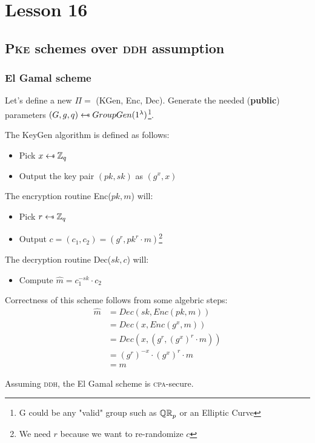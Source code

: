 \chapter*{Lesson 16}
\section{\textsc{Pke} schemes over \textsc{ddh} assumption}
\subsection{El Gamal scheme}
Let's define a new $\Pi=$ (KGen, Enc, Dec). Generate the needed (\textbf{public}) parameters $(G,g,q)\pickUAR GroupGen(1^{\lambda})$\footnote{G could be any "valid" group such as $\QR[p]$ or an Elliptic Curve}.

The KeyGen algorithm is defined as follows:
\begin{itemize}
    \item Pick $x \pickUAR \mathbb{Z}_q$
    \item Output the key pair $(pk, sk)$ as $(g^x, x)$
\end{itemize}
The encryption routine Enc($pk, m$) will:
\begin{itemize}
    \item Pick $r\pickUAR \mathbb{Z}_q$
    \item Output $c=(c_1, c_2)=(g^r, pk^r \cdot m)$\footnote{We need $r$ because we want to re-randomize $c$}
\end{itemize}
The decryption routine Dec($sk, c$) will:
\begin{itemize}
    \item Compute $\hat{m} = c_1^{-sk} \cdot c_2$
\end{itemize}
Correctness of this scheme follows from some algebric steps:
\begin{align*}
    \hat{m} &= Dec(sk, Enc(pk, m)) \\
    &= Dec(x, Enc(g^x, m)) \\
    &= Dec(x, (g^r, (g^x)^r \cdot m)) \\
    &= (g^r)^{-x} \cdot (g^x)^r \cdot m \\
    &= m
\end{align*}

\begin{theorem}
    Assuming \textsc{ddh}, the El Gamal scheme is \textsc{cpa}-secure.
\end{theorem}

